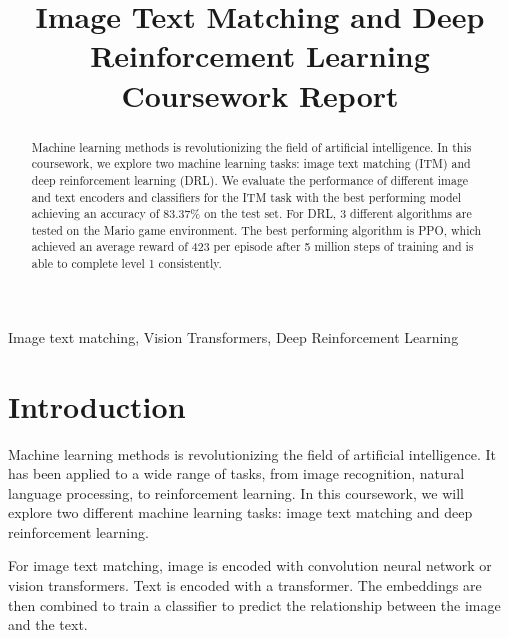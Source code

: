 \documentclass[conference]{IEEEtran}
\begin{document}
\title{Image Text Matching and Deep Reinforcement Learning Coursework Report}

\author{
}

\maketitle

\begin{abstract}
    Machine learning methods is revolutionizing the field of artificial intelligence. In this coursework, we explore two machine learning tasks: image text matching (ITM) and deep reinforcement learning (DRL). We evaluate the performance of different image and text encoders and classifiers for the ITM task with the best performing model achieving an accuracy of 83.37\% on the test set. For DRL, 3 different algorithms are tested on the Mario game environment. The best performing algorithm is PPO, which achieved an average reward of 423 per episode after 5 million steps of training and is able to complete level 1 consistently.
\end{abstract}

\begin{IEEEkeywords}
    Image text matching, Vision Transformers, Deep Reinforcement Learning
\end{IEEEkeywords}


\section{Introduction}

Machine learning methods is revolutionizing the field of artificial intelligence. It has been applied to a wide range of tasks, from image recognition, natural language processing, to reinforcement learning. In this coursework, we will explore two different machine learning tasks: image text matching and deep reinforcement learning.

For image text matching, image is encoded with convolution neural network or vision transformers. Text is encoded with a transformer. The embeddings are then combined to train a classifier to predict the relationship between the image and the text.
\end{document}
